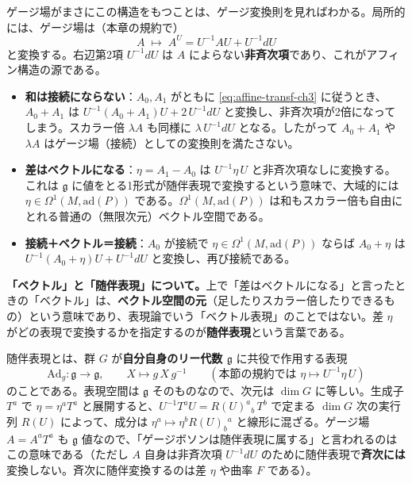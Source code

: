 \documentclass[uplatex, dvipdfmx, book]{jsbook}
\begin{document}
ゲージ場がまさにこの構造をもつことは、ゲージ変換則を見ればわかる。局所的には、ゲージ場は（本章の規約で）
\begin{equation}
    A \;\longmapsto\; A^U = U^{-1} A U + U^{-1} dU
    \label{eq:affine-transf-ch3}
\end{equation}
と変換する。右辺第2項 $U^{-1}dU$ は $A$ によらない\textbf{非斉次項}であり、これがアフィン構造の源である。
\begin{itemize}
    \item \textbf{和は接続にならない}：$A_0, A_1$ がともに \eqref{eq:affine-transf-ch3} に従うとき、$A_0 + A_1$ は $U^{-1}(A_0 + A_1)U + 2\,U^{-1}dU$ と変換し、非斉次項が2倍になってしまう。スカラー倍 $\lambda A$ も同様に $\lambda\, U^{-1}dU$ となる。したがって $A_0 + A_1$ や $\lambda A$ はゲージ場（接続）としての変換則を満たさない。
    \item \textbf{差はベクトルになる}：$\eta = A_1 - A_0$ は $U^{-1}\eta\, U$ と非斉次項なしに変換する。これは $\mathfrak{g}$ に値をとる1形式が随伴表現で変換するという意味で、大域的には $\eta \in \Omega^1(M, \mathrm{ad}(P))$ である。$\Omega^1(M, \mathrm{ad}(P))$ は和もスカラー倍も自由にとれる普通の（無限次元）ベクトル空間である。
    \item \textbf{接続＋ベクトル＝接続}：$A_0$ が接続で $\eta \in \Omega^1(M,\mathrm{ad}(P))$ ならば $A_0 + \eta$ は $U^{-1}(A_0+\eta)U + U^{-1}dU$ と変換し、再び接続である。
\end{itemize}

\textbf{「ベクトル」と「随伴表現」について。}上で「差はベクトルになる」と言ったときの「ベクトル」は、\textbf{ベクトル空間の元}（足したりスカラー倍したりできるもの）という意味であり、表現論でいう「ベクトル表現」のことではない。差 $\eta$ がどの表現で変換するかを指定するのが\textbf{随伴表現}という言葉である。

随伴表現とは、群 $G$ が\textbf{自分自身のリー代数 $\mathfrak{g}$} に共役で作用する表現
\begin{equation*}
    \mathrm{Ad}_g : \mathfrak{g} \to \mathfrak{g}, \qquad X \longmapsto g\,X\,g^{-1}
    \qquad(\text{本節の規約では } \eta \mapsto U^{-1}\eta\,U)
\end{equation*}
のことである。表現空間は $\mathfrak{g}$ そのものなので、次元は $\dim G$ に等しい。生成子 $T^a$ で $\eta = \eta^a T^a$ と展開すると、$U^{-1}T^aU = R(U)^a{}_b\, T^b$ で定まる $\dim G$ 次の実行列 $R(U)$ によって、成分は $\eta^a \mapsto \eta^b R(U)_b{}^a$ と線形に混ざる。ゲージ場 $A = A^aT^a$ も $\mathfrak{g}$ 値なので、「ゲージボソンは随伴表現に属する」と言われるのはこの意味である（ただし $A$ 自身は非斉次項 $U^{-1}dU$ のために随伴表現で\textbf{斉次には}変換しない。斉次に随伴変換するのは差 $\eta$ や曲率 $F$ である）。
\end{document}
